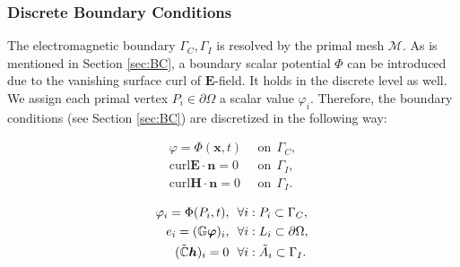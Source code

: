 \documentclass{article}
\begin{document}
\subsubsection{Discrete Boundary Conditions}
The electromagnetic boundary $\Gamma_C, \Gamma_I$ is resolved by the primal mesh $\mathcal{M}$. As is mentioned in Section \ref{sec:BC}, a boundary scalar potential $\Phi$ can be introduced due to the vanishing surface curl of $\mathbf{E}$-field. It holds in the discrete level as well. We assign each primal vertex $P_i \in \partial\Omega$ a scalar value $\varphi_i$. Therefore, the boundary conditions (see Section \ref{sec:BC}) are discretized in the following way:
\begin{center}
    \vspace{-0.5cm}
    \begin{minipage}{0.3\textwidth}
    \begin{align*}
    \varphi = \Phi(\mathbf{x}, t)\ \ &\text{on} \ \ \Gamma_C, \\
    \text{curl} \mathbf{E} \cdot \mathbf{n} = 0\ \ &\text{on} \ \  \Gamma_I,  \\
    \text{curl} \mathbf{H} \cdot \mathbf{n} = 0\ \  &\text{on} \ \  \Gamma_I.\
    \end{align*}
    \end{minipage}
    \begin{minipage}{0.1\textwidth}
    \centering
    \end{minipage}
    \begin{minipage}{0.4\textwidth}
        \begin{subequations}
            \begin{align}
            \varphi_i = \Phi(P_i, t), \ \ &\forall i : P_i \subset \Gamma_C, \label{equ:bc_1}\\
            e_i = (\mathbb{G}\bm{\varphi})_i,\ \ &\forall i : L_i \subset \partial\Omega, \label{equ:bc_2}\\
            (\Tilde{\mathbb{C}} \bm{h})_i = 0\ \ &\forall i : \Tilde{A}_i \subset \Gamma_I.\label{equ:bc_3}\
            \end{align}
        \end{subequations}
    \end{minipage}
\end{center}
\end{document}
